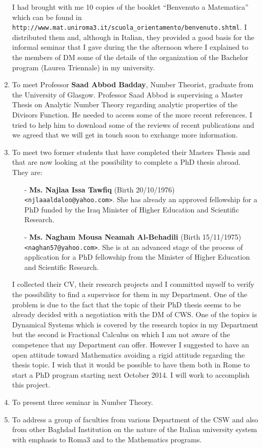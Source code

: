 \documentclass[12pt,a4paper]{scrartcl}
\begin{document}
\begin{enumerate}
I had brought with me 10 copies of the booklet ``Benvenuto a Matematica'' which can
 be found in \texttt{http://www.mat.uniroma3.it/scuola\_orientamento/benvenuto.shtml}. I distributed them and, although in Italian, they provided
 a good basis for the informal seminar that I gave during the the afternoon where I explained to the members of DM some of the details of the
 organization of the Bachelor program (Laurea Triennale) in my university. 
 \item To meet Professor \textbf{Saad Abbod Badday}, Number Theorist, graduate from the University of Glasgow. 
 Professor Saad Abbod is supervising
 a Master Thesis on Analytic Number Theory regarding analytic properties of the Divisors Function. He needed to access some of the more recent
 references. I tried to help him to download some of the reviews of recent publications and we agreed that we will get in touch soon to exchange more
 information.
 \item To meet two former students that have completed their Masters Thesis and that are now looking at the possibility to complete a PhD thesis abroad.
 They are:
 \begin{itemize}\itemsep2pt
  \item[-] \textbf{Ms. Najlaa Issa Tawfiq} (Birth 20/10/1976) \texttt{<njlaaaldaloo@yahoo.com>}. She has already an approved fellowship for a PhD funded by the Iraq
  Minister of Higher Education and Scientific Research. 
  \item[-] \textbf{Ms. Nagham Mousa Neamah Al-Behadili} (Birth 15/11/1975) \texttt{<naghan57@yahoo.com>}. 
  She is at an advanced stage of the process of application for a PhD
  fellowship from the Minister of Higher Education and Scientific Research.
 \end{itemize}
I collected their CV, their research projects and I committed myself to verify the possibility to find a supervisor for them in my Department. One of the problem
is due to the fact that the topic of their PhD thesis seems to be already decided with a negotiation with the DM of CWS. One of the topics is
Dynamical Systems which is covered by the research topics in my Department but the second is Fractional Calculus on which I am not aware of the 
competence that my Department can offer. However I suggested to have an open attitude toward Mathematics avoiding a rigid attitude regarding the thesis topic.
I wish that it would be possible to have them both in Rome to start a PhD program starting next October 2014. I will work to accomplish this project.

 \item To present three seminar in Number Theory.

 \item To address a group of faculties from various Department of the CSW and also from other Baghdad Institution on the nature of the Italian
 university system with emphasis to Roma3 and to the Mathematics programs. 
\end{enumerate}
\end{document}
